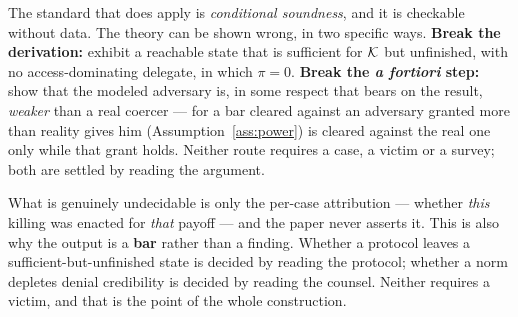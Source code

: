\begin{remark}
The standard that does apply is \emph{conditional soundness}, and it is checkable
without data. The theory can be shown wrong, in two specific ways. \textbf{Break the
derivation:} exhibit a reachable state that is sufficient for $\mathcal{K}$ but unfinished,
with no access-dominating delegate, in which $\pi = 0$. \textbf{Break the \emph{a
fortiori} step:} show that the modeled adversary is, in some respect that bears on the
result, \emph{weaker} than a real coercer --- for a bar cleared against an adversary
granted more than reality gives him (Assumption~\ref{ass:power}) is cleared against the real one
only while that grant holds. Neither route requires a case, a victim or a survey; both
are settled by reading the argument.

What is genuinely undecidable is only the per-case attribution --- whether \emph{this}
killing was enacted for \emph{that} payoff --- and the paper never asserts it. This is
also why the output is a \textbf{bar} rather than a finding. Whether a protocol leaves a
sufficient-but-unfinished state is decided by reading the protocol; whether a norm
depletes denial credibility is decided by reading the counsel. Neither requires a
victim, and that is the point of the whole construction.
\end{remark}
